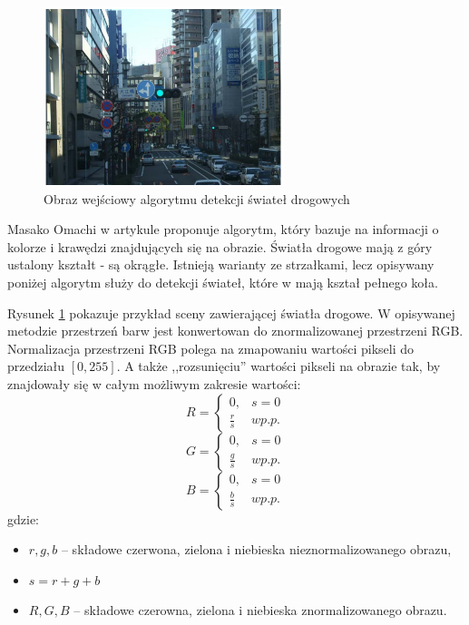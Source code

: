\begin{figure}
  \centering
  \includegraphics[width=7cm]{img/tl_input.png}
  \caption{Obraz wejściowy algorytmu detekcji świateł drogowych\cite{T4}}
  \label{fig:tl_input}
\end{figure}

Masako Omachi w artykule \cite{T4} proponuje algorytm, który bazuje na informacji o kolorze i krawędzi znajdujących się na obrazie. Światła drogowe mają z góry ustalony kształt - są okrągłe. Istnieją warianty ze strzałkami, lecz opisywany poniżej algorytm służy do detekcji świateł, które w \cite{Kodeks} mają kształ pełnego koła.

Rysunek \ref{fig:tl_input} pokazuje przykład sceny zawierającej światła drogowe. W opisywanej metodzie przestrzeń barw jest konwertowan do znormalizowanej przestrzeni RGB. Normalizacja przestrzeni RGB polega na zmapowaniu wartości pikseli do przedziału $[0,255]$. A także ,,rozsunięciu'' wartości pikseli na obrazie tak, by znajdowały się w całym możliwym zakresie wartości:
\begin{equation}
R=\left\{\begin{matrix}
0, &  s=0\\
\frac{r}{s} & w p.p.
\end{matrix}\right.
\end{equation}
\begin{equation}
G=\left\{\begin{matrix}
0, &  s=0\\
\frac{g}{s} & w p.p.
\end{matrix}\right.
\end{equation}
\begin{equation}
B=\left\{\begin{matrix}
0, &  s=0\\
\frac{b}{s} & w p.p.
\end{matrix}\right.
\end{equation}
gdzie:
\begin{itemize}
\item$r,g,b$ -- składowe czerwona, zielona i niebieska nieznormalizowanego obrazu,
\item$s = r+g+b$
\item$R,G,B$ -- składowe czerowna, zielona i niebieska znormalizowanego obrazu.
\end{itemize}


